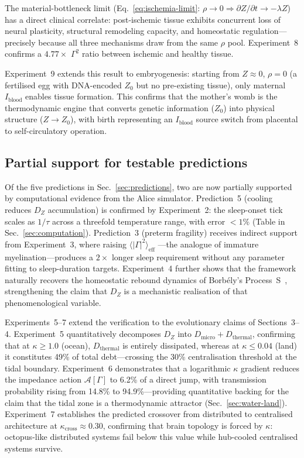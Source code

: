 ﻿\documentclass[aps,pre,twocolumn,superscriptaddress,floatfix]{revtex4-2}
\begin{document}
The material-bottleneck limit
(Eq.~\eqref{eq:ischemia-limit}: $\rho \to 0 \Rightarrow
\partial Z/\partial t \to -\lambda Z$)
has a direct clinical correlate:
post-ischemic tissue exhibits concurrent loss of
neural plasticity, structural remodeling capacity, and
homeostatic regulation---precisely because all three
mechanisms draw from the same $\rho$ pool.
Experiment~8 confirms a $4.77\times$ $\Gamma^2$ ratio
between ischemic and healthy tissue.

Experiment~9 extends this result to embryogenesis:
starting from $Z \approx 0$, $\rho = 0$ (a fertilised egg
with DNA-encoded $Z_0$ but no pre-existing tissue),
only maternal $I_{\mathrm{blood}}$ enables tissue formation.
This confirms that the mother's womb is the thermodynamic
engine that converts genetic information ($Z_0$) into
physical structure ($Z \to Z_0$), with birth representing
an $I_{\mathrm{blood}}$ source switch from placental to
self-circulatory operation.

\subsection{Partial support for testable predictions}

Of the five predictions in Sec.~\ref{sec:predictions},
two are now partially supported by computational evidence
from the Alice simulator.
Prediction~5 (cooling reduces $D_Z$ accumulation) is
confirmed by Experiment~2:
the sleep-onset tick scales as $1/\tau$ across a
threefold temperature range, with error $< 1\%$
(Table in Sec.~\ref{sec:computation}).
Prediction~3 (preterm fragility) receives indirect support
from Experiment~3, where raising
$\langle|\Gamma|^2\rangle_{\mathrm{eff}}$
---the analogue of immature myelination---produces
a $2\times$ longer sleep requirement without
any parameter fitting to sleep-duration targets.
Experiment~4 further shows that the framework
naturally recovers the homeostatic rebound dynamics
of Borb\'{e}ly's Process~S~\cite{Borbely1982},
strengthening the claim that $D_Z$ is a mechanistic
realisation of that phenomenological variable.

Experiments~5--7 extend the verification to the
evolutionary claims of Sections~3--4.
Experiment~5 quantitatively decomposes $D_Z$ into
$D_{\mathrm{micro}} + D_{\mathrm{thermal}}$,
confirming that at $\kappa \ge 1.0$ (ocean),
$D_{\mathrm{thermal}}$ is entirely dissipated,
whereas at $\kappa \le 0.04$ (land) it constitutes
49\% of total debt---crossing the 30\%
centralisation threshold at the tidal boundary.
Experiment~6 demonstrates that a logarithmic
$\kappa$ gradient reduces the impedance action
$\mathcal{A}[\Gamma]$ to 6.2\% of a direct jump,
with transmission probability rising from 14.8\%
to 94.9\%---providing quantitative backing for
the claim that the tidal zone is a thermodynamic
attractor (Sec.~\ref{sec:water-land}).
Experiment~7 establishes the predicted crossover
from distributed to centralised architecture
at $\kappa_{\mathrm{cross}} \approx 0.30$,
confirming that brain topology is forced by $\kappa$:
octopus-like distributed systems fail below this value
while hub-cooled centralised systems survive.
\end{document}
